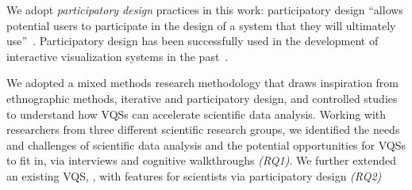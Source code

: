 \par We adopt {\em participatory design} practices in this work: participatory design ``allows potential users to 
 participate in the design of a system that they will ultimately use''~\cite{Gould1983,Muller1993}. Participatory design has been successfully used in the development of interactive visualization systems in the past~\cite{Aragon2008,Chuang2012}.  %
\par We adopted a mixed methods research methodology that draws inspiration from ethnographic methods, iterative and participatory design, and controlled studies~\cite{jorgensen_2008,miller_salkind_miller_2002,shneiderman2006strategies,Muller1993} to understand how VQSs can accelerate scientific data analysis.  Working with researchers from three different scientific research groups, we identified the needs and challenges of scientific data analysis and the potential opportunities for VQSs to fit in, via interviews and cognitive walkthroughs {\em (RQ1)}. We further extended an existing VQS, \zv, with features for scientists via participatory design {\em (RQ2)}  
